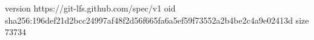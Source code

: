 version https://git-lfs.github.com/spec/v1
oid sha256:196def21d2bcc24997af48f2d56f665fa6a5ef59f73552a2b4be2c4a9e02413d
size 73734
